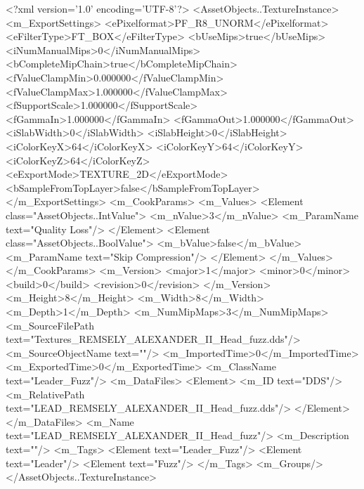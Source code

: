 <?xml version='1.0' encoding='UTF-8'?>
<AssetObjects..TextureInstance>
  <m_ExportSettings>
    <ePixelformat>PF_R8_UNORM</ePixelformat>
    <eFilterType>FT_BOX</eFilterType>
    <bUseMips>true</bUseMips>
    <iNumManualMips>0</iNumManualMips>
    <bCompleteMipChain>true</bCompleteMipChain>
    <fValueClampMin>0.000000</fValueClampMin>
    <fValueClampMax>1.000000</fValueClampMax>
    <fSupportScale>1.000000</fSupportScale>
    <fGammaIn>1.000000</fGammaIn>
    <fGammaOut>1.000000</fGammaOut>
    <iSlabWidth>0</iSlabWidth>
    <iSlabHeight>0</iSlabHeight>
    <iColorKeyX>64</iColorKeyX>
    <iColorKeyY>64</iColorKeyY>
    <iColorKeyZ>64</iColorKeyZ>
    <eExportMode>TEXTURE_2D</eExportMode>
    <bSampleFromTopLayer>false</bSampleFromTopLayer>
  </m_ExportSettings>
  <m_CookParams>
    <m_Values>
      <Element class="AssetObjects..IntValue">
        <m_nValue>3</m_nValue>
        <m_ParamName text="Quality Loss"/>
      </Element>
      <Element class="AssetObjects..BoolValue">
        <m_bValue>false</m_bValue>
        <m_ParamName text="Skip Compression"/>
      </Element>
    </m_Values>
  </m_CookParams>
  <m_Version>
    <major>1</major>
    <minor>0</minor>
    <build>0</build>
    <revision>0</revision>
  </m_Version>
  <m_Height>8</m_Height>
  <m_Width>8</m_Width>
  <m_Depth>1</m_Depth>
  <m_NumMipMaps>3</m_NumMipMaps>
  <m_SourceFilePath text="Textures\LEAD_REMSELY_ALEXANDER_II_Head_fuzz.dds"/>
  <m_SourceObjectName text=""/>
  <m_ImportedTime>0</m_ImportedTime>
  <m_ExportedTime>0</m_ExportedTime>
  <m_ClassName text="Leader_Fuzz"/>
  <m_DataFiles>
    <Element>
      <m_ID text="DDS"/>
      <m_RelativePath text="LEAD_REMSELY_ALEXANDER_II_Head_fuzz.dds"/>
    </Element>
  </m_DataFiles>
  <m_Name text="LEAD_REMSELY_ALEXANDER_II_Head_fuzz"/>
  <m_Description text=""/>
  <m_Tags>
    <Element text="Leader_Fuzz"/>
    <Element text="Leader"/>
    <Element text="Fuzz"/>
  </m_Tags>
  <m_Groups/>
</AssetObjects..TextureInstance>
